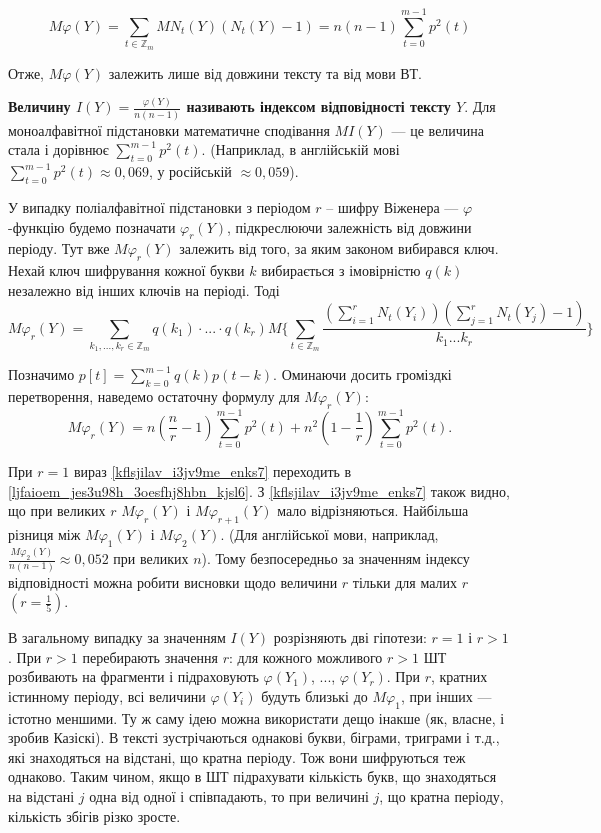 \begin{equation}
    \label{ljfaioem_jes3u98h_3oesfhj8hbn_kjsl6}
    M\varphi(Y) = \sum\limits_{t \in \mathbb{Z}_m} MN_t(Y)(N_t(Y) - 1) = n(n-1)\sum\limits_{t=0}^{m-1} p^2(t)
\end{equation}


Отже, $M\varphi(Y)$ залежить лише від довжини тексту та від мови ВТ.

\textbf{Величину $I(Y) = \frac{\varphi(Y)}{n(n-1)}$ називають індексом відповідності тексту $Y$}.
Для моноалфавітної підстановки математичне сподівання $MI(Y)$ --- це
величина стала і дорівнює $\sum\limits_{t=0}^{m-1} p^2(t)$. (Наприклад, в англійській
мові $\sum\limits_{t=0}^{m-1} p^2(t) \approx 0,069$, у російській $\approx 0,059$).

У випадку поліалфавітної підстановки з періодом $r$ – шифру Віженера
--- $\varphi$-функцію будемо позначати $\varphi_r(Y)$, підкреслюючи залежність від
довжини періоду. Тут вже $M\varphi_r(Y)$ залежить від того, за яким законом
вибирався ключ. Нехай ключ шифрування кожної букви $k$ вибирається з
імовірністю $q(k)$ незалежно від інших ключів на періоді. Тоді
$$ M\varphi_r(Y)
    = \sum\limits_{k_1, ..., k_r \in \mathbb{Z}_m} q(k_1) \cdot ... \cdot q(k_r) 
    M \{ \sum\limits_{t \in \mathbb{Z}_m} \frac{(\sum\limits_{i=1}^r N_t(Y_i))(\sum\limits_{j=1}^r N_t(Y_j) - 1)}{k_1...k_r} \}
$$

Позначимо $p[t] = \sum\limits_{k=0}^{m-1} q(k) p(t-k)$. Оминаючи досить громіздкі
перетворення, наведемо остаточну формулу для $M\varphi_r(Y)$:
\begin{equation}
    \label{kflsjilav_i3jv9me_enks7}
    M\varphi_r(Y)
    = n (\frac{n}{r} - 1) \sum\limits_{t=0}^{m-1}p^2(t) + n^2 (1 - \frac{1}{r}) \sum\limits_{t=0}^{m-1}p^2(t).
\end{equation}

При $r = 1$ вираз \ref{kflsjilav_i3jv9me_enks7} переходить
в \ref{ljfaioem_jes3u98h_3oesfhj8hbn_kjsl6}. З \ref{kflsjilav_i3jv9me_enks7}
також видно, що при великих
$r$ $M\varphi_r(Y)$ і $M\varphi_{r+1}(Y)$ мало відрізняються.
Найбільша різниця між
$M\varphi_1(Y)$ і $M\varphi_2(Y)$. (Для англійської мови, наприклад,
$\frac{M \varphi_2(Y)}{n(n-1)} \approx 0,052$
при великих $n$). Тому безпосередньо за значенням індексу відповідності можна
робити висновки щодо величини $r$ тільки для малих $r$ $(r = \frac{1}{5})$.

В загальному випадку за значенням $I(Y)$ розрізняють дві гіпотези:
$r = 1$ і $r > 1$. При $r > 1$ перебирають значення $r$: для кожного можливого $r > 1$
ШТ розбивають на фрагменти і підраховують $\varphi(Y_1)$, ..., $\varphi(Y_r)$. При $r$, кратних
істинному періоду, всі величини $\varphi(Y_i)$ будуть близькі до $M\varphi_1$, при інших ---
істотно меншими. Ту ж саму ідею можна використати дещо інакше (як,
власне, і зробив Казіскі). В тексті зустрічаються однакові букви, біграми,
триграми і т.д., які знаходяться на відстані, що кратна періоду. Тож вони
шифруються теж однаково. Таким чином, якщо в ШТ підрахувати кількість
букв, що знаходяться на відстані $j$ одна від одної і співпадають, то при
величині $j$, що кратна періоду, кількість збігів різко зросте.

